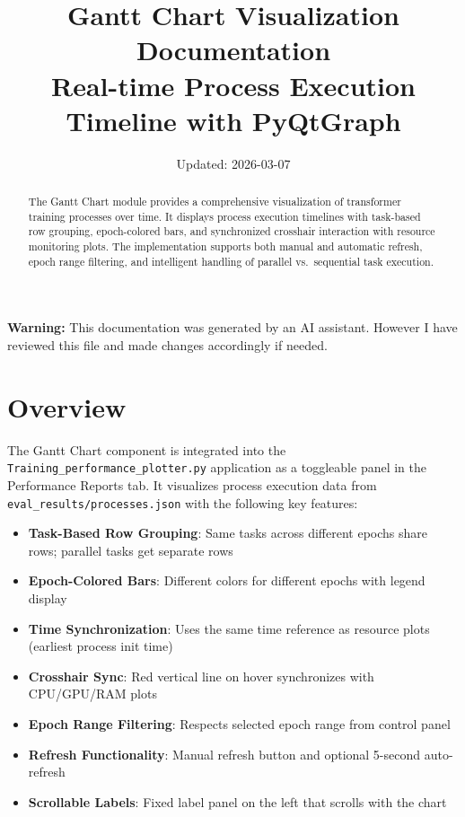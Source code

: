\documentclass[11pt,a4paper]{article}
\title{\textbf{Gantt Chart Visualization Documentation}\\
\large Real-time Process Execution Timeline with PyQtGraph}
\author{}
\date{Updated: 2026-03-07}
\begin{document}
\maketitle
\thispagestyle{empty}

\begin{warningbox}
\textbf{Warning:} This documentation was generated by an AI assistant. However I have reviewed this file and made changes accordingly if needed.
\end{warningbox}

\vspace{1em}

\begin{abstract}
\noindent The Gantt Chart module provides a comprehensive visualization of transformer training processes over time. It displays process execution timelines with task-based row grouping, epoch-colored bars, and synchronized crosshair interaction with resource monitoring plots. The implementation supports both manual and automatic refresh, epoch range filtering, and intelligent handling of parallel vs.\ sequential task execution.
\end{abstract}

\tableofcontents
\newpage

\section{Overview}

The Gantt Chart component is integrated into the \texttt{Training\_performance\_plotter.py} application as a toggleable panel in the Performance Reports tab. It visualizes process execution data from \texttt{eval\_results/processes.json} with the following key features:

\begin{itemize}
    \item \textbf{Task-Based Row Grouping}: Same tasks across different epochs share rows; parallel tasks get separate rows
    \item \textbf{Epoch-Colored Bars}: Different colors for different epochs with legend display
    \item \textbf{Time Synchronization}: Uses the same time reference as resource plots (earliest process init time)
    \item \textbf{Crosshair Sync}: Red vertical line on hover synchronizes with CPU/GPU/RAM plots
    \item \textbf{Epoch Range Filtering}: Respects selected epoch range from control panel
    \item \textbf{Refresh Functionality}: Manual refresh button and optional 5-second auto-refresh
    \item \textbf{Scrollable Labels}: Fixed label panel on the left that scrolls with the chart
\end{itemize}
\end{document}
